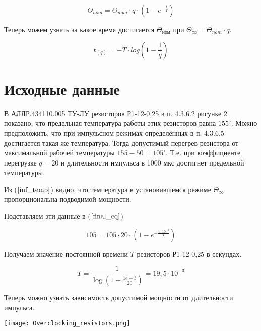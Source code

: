 \documentclass[a4paper]{article}
\begin{document}
\begin{equation}
\label{overpowered_eq}
\Theta_{nom} = \Theta_{nom}{\cdot}q{\cdot}(1-e^{-\frac{t}{T}})
\end{equation}

Теперь можем узнать за какое время достигается $\Theta_{ном}$ при
$\Theta_{\infty}=\Theta_{nom}{\cdot}q$.

\begin{equation}
\label{tpulse_eq}
    t_{(q)} = -T{\cdot}log(1-\frac1q)
\end{equation}

\section{Исходные данные}

	В АЛЯР.434110.005 ТУ-ЛУ \cite{alyr.434110.005} резисторов Р1-12-0,25 в п.
4.3.6.2 рисунке 2 показано, что предельная температура работы этих резисторов равна
$155^{\circ}$. Можно предположить, что при импульсном режимах определённых в п.
4.3.6.5 достигается такая же температура. Тогда допустимый перегрев резистора от
максимальной рабочей температуры $155-50=105^{\circ}$. Т.е. при коэффициенте
перегрузке $q=20$ и длительности импульса в 1000 мкс достигнет предельной температуры.

    Из ($\ref{inf_temp}$) видно, что температура в установившемся режиме
${\Theta}_{\infty}$ пропорциональна подводимой мощности.

    Подставляем эти данные в ($\ref{final_eq}$)

\begin{equation}
105 = 105{\cdot}20{\cdot}(1-e^{-\frac{1{\cdot}10^{-3}}{T}})
\end{equation}

    Получаем значение постоянной времени $T$ резисторов Р1-12-0,25 в секундах.

\begin{equation}
T=\frac{1}{\log{(1-\frac{1e-3}{20})}}=19,5{\cdot}10^{-3}
\end{equation}

% 

    Теперь можно узнать зависимость допустимой мощности от длительности импульса.

\texttt{[image: Overclocking\_resistors.png]}
\end{document}
